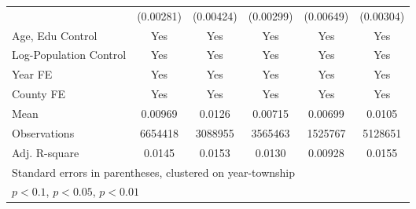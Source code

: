 \begin{table}
{{\begin{tabular}{l*{5}{c}}
                                                        & (\num{0.00281})                       & (\num{0.00424})                       & (\num{0.00299})                  & (\num{0.00649})                 & (\num{0.00304})                     \\
                Age, Edu Control                        & Yes                             & Yes                             & Yes                        & Yes                       & Yes                           \\
                Log-Population Control                  & Yes                             & Yes                             & Yes                        & Yes                       & Yes                           \\
                Year FE                                 & Yes                             & Yes                             & Yes                        & Yes                       & Yes                           \\
                County FE                               & Yes                             & Yes                             & Yes                        & Yes                       & Yes                           \\
                \midrule
                Mean                                    & \num{0.00969}                         & \num{0.0126}                          & \num{0.00715}                    & \num{0.00699}                   & \num{0.0105}                        \\
                Observations                            & \num{6654418}                         & \num{3088955}                         & \num{3565463}                    & \num{1525767}                   & \num{5128651}                       \\
                Adj. R-square                           & \num{0.0145}                          & \num{0.0153}                          & \num{0.0130}                     & \num{0.00928}                   & \num{0.0155}                        \\
                \bottomrule
                \multicolumn{6}{l}{\footnotesize Standard errors in parentheses, clustered on year-township}                                                                                                                                     \\
                \multicolumn{6}{l}{\footnotesize \sym{*} \(p<0.1\), \sym{**} \(p<0.05\), \sym{***} \(p<0.01\)}                                                                                                       \\
            \end{tabular}
        }
    }
\end{table}